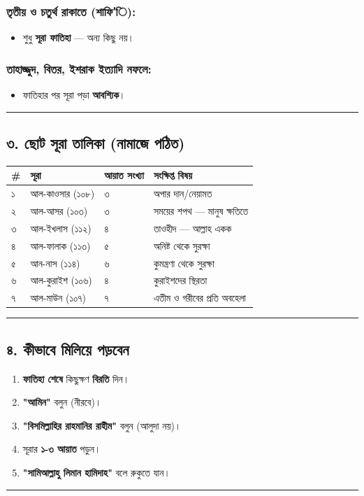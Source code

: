 \subsubsection*{\textbf{তৃতীয় ও চতুর্থ রাকাতে (শাফি'ি):}}
\begin{itemize}
\item শুধু \textbf{সূরা ফাতিহা} — অন্য কিছু নয়।
\end{itemize}
\subsubsection*{\textbf{তাহাজ্জুদ, বিতর, ইশরাক ইত্যাদি নফলে:}}
\begin{itemize}
\item ফাতিহার পর সূরা পড়া \textbf{আবশ্যিক}।
\end{itemize}
\medskip\hrule\medskip

\subsection*{৩. ছোট সূরা তালিকা (নামাজে পঠিত)}

\begin{table}[h]\centering\small
\begin{tabular}{llll}
\# & সূরা & আয়াত সংখ্যা & সংক্ষিপ্ত বিষয় \\
\hline
১ & আল-কাওসার (১০৮) & ৩ & অপার দান/নেয়ামত \\
২ & আল-আসর (১০৩) & ৩ & সময়ের শপথ — মানুষ ক্ষতিতে \\
৩ & আল-ইখলাস (১১২) & ৪ & তাওহীদ — আল্লাহ একক \\
৪ & আল-ফালাক (১১৩) & ৫ & অনিষ্ট থেকে সুরক্ষা \\
৫ & আন-নাস (১১৪) & ৬ & কুমন্ত্রণা থেকে সুরক্ষা \\
৬ & আল-কুরাইশ (১০৬) & ৪ & কুরাইশদের স্থিরতা \\
৭ & আল-মাউন (১০৭) & ৭ & এতীম ও গরীবের প্রতি অবহেলা \\
\hline
\end{tabular}
\end{table}

\medskip\hrule\medskip

\subsection*{৪. কীভাবে মিলিয়ে পড়বেন}

\begin{enumerate}
\item \textbf{ফাতিহা শেষে} কিছুক্ষণ \textbf{বিরতি} দিন।
\item \textbf{"আমিন"} বলুন (নীরবে)।
\item \textbf{"বিসমিল্লাহির রাহমানির রাহীম"} বলুন (আলুদা নয়)।
\item সূরার \textbf{১-৩ আয়াত} পড়ুন।
\item \textbf{"সামিআল্লাহু লিমান হামিদাহ"} বলে রুকুতে যান।
\end{enumerate}
\medskip\hrule\medskip

